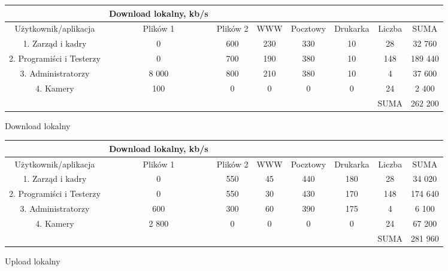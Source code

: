\documentclass{article}
\begin{document}
\begin{Tabela}[!ht]
	\centering
\begin{tabular}{|c|c|c|c|c|c|c|c} \hline
	& Download lokalny, kb/s \\
	\hline
	Użytkownik/aplikacja & Plików 1 & Plików 2&WWW&Pocztowy&Drukarka&Liczba&SUMA\\
	\hline
	1. Zarząd i kadry  & 0 & 600&230&330&10&28&32 760\\
	2. Programiści i Testerzy & 0 & 700&190&380&10&148&189 440\\
	3. Administratorzy & 8 000 & 800&210&380&10&4&37 600\\
	4. Kamery & 100 & 0&0&0&0&24&2 400\\
	\hline
	\hline
	&&&&&&SUMA &262 200 \\
	\hline
\end{tabular}
\caption{Download lokalny}
\end{Tabela}
\begin{Tabela}[!ht]
	\centering
	\begin{tabular}{|c|c|c|c|c|c|c|c} \hline
		& Download lokalny, kb/s \\
		\hline
		Użytkownik/aplikacja & Plików 1 & Plików 2&WWW&Pocztowy&Drukarka&Liczba&SUMA\\
		\hline
		1. Zarząd i kadry  & 0 & 550 & 45 & 440 & 180 & 28 & 34 020\\
		2. Programiści i Testerzy & 0 & 550 & 30 & 430 & 170 & 148 & 174 640\\
		3. Administratorzy & 600 & 300 & 60 & 390 & 175 & 4 &6 100\\
		4. Kamery & 2 800 & 0 & 0 & 0 & 0 & 24 & 67 200\\
		\hline
		\hline
		&&&&&&SUMA &281 960 \\
		\hline
	\end{tabular}
	\caption{Upload lokalny}
\end{Tabela}
\end{document}
